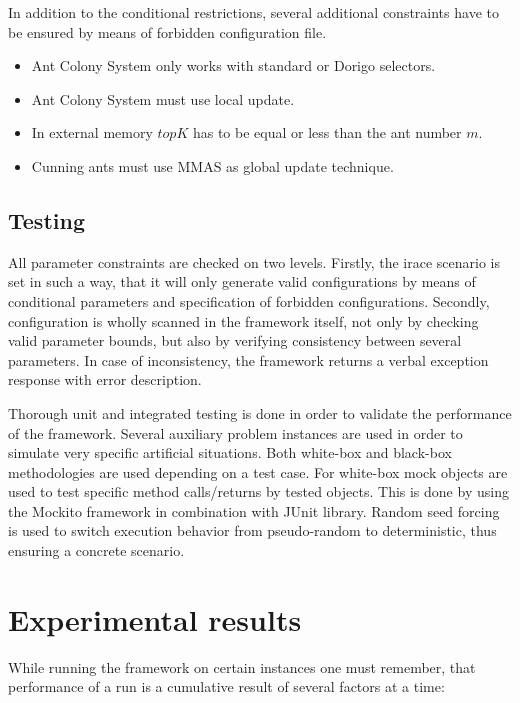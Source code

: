 \documentclass[12pt,a4paper,oneside]{book}
\begin{document}
In addition to the conditional restrictions, several additional constraints have to be ensured by means of forbidden configuration file.

\begin{itemize}
\item Ant Colony System only works with standard or Dorigo selectors.

\item Ant Colony System must use local update.

\item In external memory $topK$ has to be equal or less than the ant number $m$.

\item Cunning ants must use MMAS as global update technique.
\end{itemize}


\section{Testing}


All parameter constraints are checked on two levels. Firstly, the irace scenario is set in such a way, that it will only generate valid configurations by means of conditional parameters and specification of forbidden configurations. Secondly, configuration is wholly scanned in the framework itself, not only by checking valid parameter bounds, but also by verifying consistency between several parameters. In case of inconsistency, the framework returns a verbal exception response with error description.

Thorough unit and integrated testing is done in order to validate the performance of the framework. Several auxiliary problem instances are used in order to simulate very specific artificial situations. Both white-box and black-box methodologies are used depending on a test case. For white-box mock objects are used to test specific method calls/returns by tested objects. This is done by using the Mockito framework in combination with JUnit library. Random seed forcing is used to switch execution behavior
from pseudo-random to deterministic, thus ensuring a concrete scenario.

\chapter{Experimental results}

While running the framework on certain instances one must remember, that performance of a run is a cumulative result of several factors at a time: 
\end{document}
